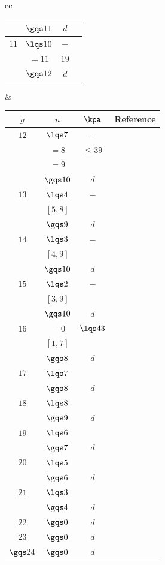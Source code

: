 \documentclass[a4paper, twoside]{article}
\begin{document}
\begin{table}[H]
\begin{tabular}{cc}
\begin{tabular}[t]{cccc}
				& $\gqs11$ & $d$ & \cite{FP2005} \\
		  	\hline
		  	$11$& $\lqs10$ & $-$ & \cite{Logan2003} \\
				& $=11$ & $19$& \cite{Logan2003} \\
				& $\gqs12$ & $d$ & \cite{Farkas2009} \\
		  	\bottomrule
		\end{tabular} &
		\begin{tabular}[t]{cccc}
		  	\toprule
		  	$g$ & $n$   & $\kpa$ & Reference \\
		  	\midrule
		  	$12$& $\lqs7$  & $-$ & \cite{AB2021} \\
				& $=8$  & $\leq39$ & \cite{AB2021} \\
				& $=9$  & \red{NK} & \\
				& $\gqs10$ & $d$ & \cite{Kadikoylu2020} \\
		  	\hline
		  	$13$& $\lqs4$  & $-$ & \cite{AB2021} \\
				& $[5,8]$ & \red{NK} & \\
				& $\gqs9$  & $d$ & \cite{FJP2021} \\
		  	\hline
			$14$& $\lqs3$  & $-$ & \cite{AB2021} \\
				& $[4,9]$ & \red{NK} & \\
				& $\gqs10$ & $d$ & \cite{AB2021} \\
		  	\hline
		  	$15$& $\lqs2$  & $-$ & \cite{AB2021} \\
				& $[3,9]$ & \red{NK} & \\
				& $\gqs10$ & $d$ & \cite{AB2021} \\
		  	\hline
		  	$16$& $=0$  & $\lqs43$ & \cite{AB2021} \\
				& $[1,7]$ & \red{NK} & \\
				& $\gqs8$ & $d$ & \cite{Kadikoylu2020} \\
		  	\hline
			$17$& $\lqs7$ & \red{NK} & \\
				& $\gqs8$ & $d$ & \cite{Kadikoylu2020} \\
		  	\hline
		  	$18$& $\lqs8$ & \red{NK} & \\
				& $\gqs9$ & $d$ & \cite{Farkas2009} \\
		  	\hline
			$19$& $\lqs6$ & \red{NK} & \\
				& $\gqs7$ & $d$ & \cite{Farkas2009} \\
		  	\hline
			$20$& $\lqs5$ & \red{NK} & \\
				& $\gqs6$ & $d$ & \cite{Farkas2009} \\
		  	\hline
		  	$21$& $\lqs3$ & \red{NK} & \\
				& $\gqs4$ & $d$ & \cite{Farkas2009} \\
		  	\hline
			$22$& $\gqs0$ & $d$ & \cite{FJP2020} \\
		  	$23$& $\gqs0$ & $d$ & \cite{FJP2020} \\
		  	\hline
		  	$\gqs24$& $\gqs0$ & $d$ & \cite{EH1987Kodaira} \\
		  	\bottomrule
		\end{tabular}
	\end{tabular}
\end{table}
\end{document}
